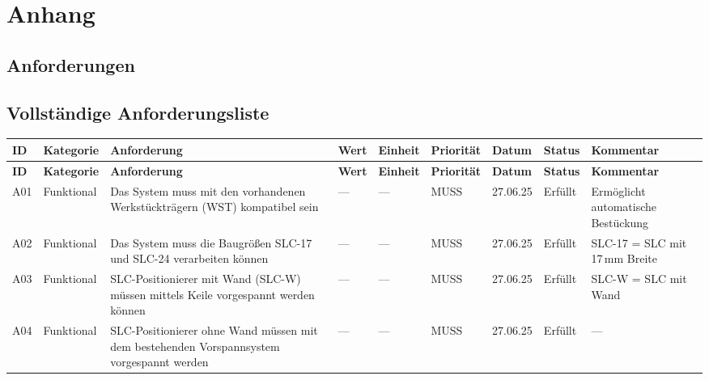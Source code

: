\appendix
\section*{Anhang}
\appendixtoc
\captionsetup{listof=false}
\clearpage

\begin{landscape}
\section{Anforderungen}
\subsection{Vollständige Anforderungsliste}

\small
\setlength{\tabcolsep}{3pt}
\renewcommand{\arraystretch}{1.15}
\setlength{\LTcapwidth}{\textwidth}
\captionsetup{justification=raggedright,singlelinecheck=false}

\begin{longtable}{|l|p{}|p{8.5cm}|l|l|l|l|l|p{4.0cm}|}

\hline
\textbf{ID} &
\textbf{Kategorie} &
\textbf{Anforderung} &
\textbf{Wert} &
\textbf{Einheit} &
\textbf{Priorität} &
\textbf{Datum} &
\textbf{Status} &
\textbf{Kommentar} \\
\hline
\endfirsthead

\hline
\textbf{ID} &
\textbf{Kategorie} &
\textbf{Anforderung} &
\textbf{Wert} &
\textbf{Einheit} &
\textbf{Priorität} &
\textbf{Datum} &
\textbf{Status} &
\textbf{Kommentar} \\
\hline
\endhead
\endlastfoot

A01 & Funktional &
Das System muss mit den vorhandenen Werkstückträgern (WST) kompatibel sein &
— & — & MUSS & 27.06.25 & Erfüllt &
Ermöglicht automatische Bestückung \\
\hline

A02 & Funktional &
Das System muss die Baugrößen SLC-17 und SLC-24 verarbeiten können &
— & — & MUSS & 27.06.25 & Erfüllt &
SLC-17 = SLC mit 17\,mm Breite \\
\hline

A03 & Funktional &
SLC-Positionierer mit Wand (SLC-W) müssen mittels Keile vorgespannt werden können &
— & — & MUSS & 27.06.25 & Erfüllt &
SLC-W = SLC mit Wand \\
\hline

A04 & Funktional &
SLC-Positionierer ohne Wand müssen mit dem bestehenden Vorspannsystem vorgespannt werden &
— & — & MUSS & 27.06.25 & Erfüllt &
— \\
\hline


\end{longtable}
\end{landscape}

